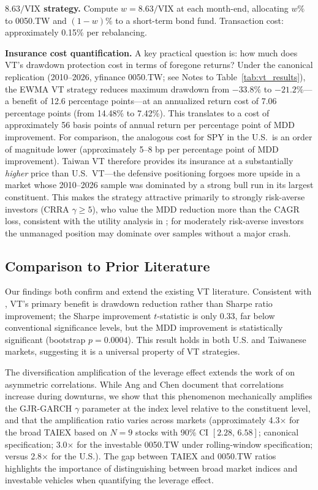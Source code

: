 \textbf{$8.63/\text{VIX}$ strategy.} Compute $w = 8.63 / \text{VIX}$ at each month-end, allocating $w\%$ to 0050.TW and $(1-w)\%$ to a short-term bond fund. Transaction cost: approximately 0.15\% per rebalancing.

\textbf{Insurance cost quantification.} A key practical question is: how much does VT's drawdown protection cost in terms of foregone returns? Under the canonical replication (2010--2026, yfinance 0050.TW; see Notes to Table~\ref{tab:vt_results}), the EWMA VT strategy reduces maximum drawdown from $-33.8\%$ to $-21.2\%$---a benefit of 12.6 percentage points---at an annualized return cost of 7.06 percentage points (from 14.48\% to 7.42\%).%
 This translates to a cost of approximately 56 basis points of annual return per percentage point of MDD improvement. For comparison, the analogous cost for SPY in the U.S.\ is an order of magnitude lower (approximately 5--8 bp per percentage point of MDD improvement). Taiwan VT therefore provides its insurance at a substantially \textit{higher} price than U.S.\ VT---the defensive positioning forgoes more upside in a market whose 2010--2026 sample was dominated by a strong bull run in its largest constituent. This makes the strategy attractive primarily to strongly risk-averse investors (CRRA $\gamma \geq 5$), who value the MDD reduction more than the CAGR loss, consistent with the utility analysis in \citet{moreira2017}; for moderately risk-averse investors the unmanaged position may dominate over samples without a major crash.

\subsection{Comparison to Prior Literature}

Our findings both confirm and extend the existing VT literature. Consistent with \citet{moreira2017}, VT's primary benefit is drawdown reduction rather than Sharpe ratio improvement; the Sharpe improvement $t$-statistic is only 0.33, far below conventional significance levels, but the MDD improvement is statistically significant (bootstrap $p = 0.0004$). This result holds in both U.S. and Taiwanese markets, suggesting it is a universal property of VT strategies.

The diversification amplification of the leverage effect extends the work of \citet{ang2002} on asymmetric correlations. While Ang and Chen document that correlations increase during downturns, we show that this phenomenon mechanically amplifies the GJR-GARCH $\gamma$ parameter at the index level relative to the constituent level, and that the amplification ratio varies across markets (approximately 4.3$\times$ for the broad TAIEX based on $N = 9$ stocks with 90\% CI $[2.28, \, 6.58]$; canonical specification; 3.0$\times$ for the investable 0050.TW under rolling-window specification; versus 2.8$\times$ for the U.S.). The gap between TAIEX and 0050.TW ratios highlights the importance of distinguishing between broad market indices and investable vehicles when quantifying the leverage effect.

